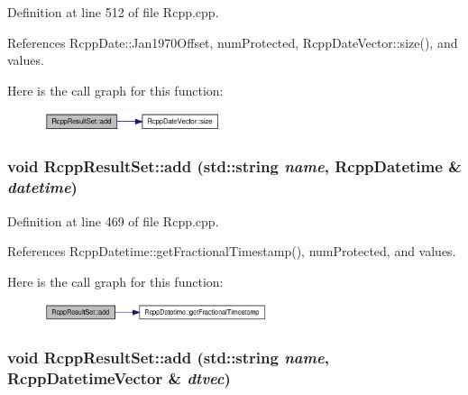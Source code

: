 Definition at line 512 of file Rcpp.cpp.

References RcppDate::Jan1970Offset, numProtected, RcppDateVector::size(), and values.

Here is the call graph for this function:\nopagebreak
\begin{figure}[H]
\begin{center}
\leavevmode
\includegraphics[width=148pt]{classRcppResultSet_d7efd746596959ce68ca98c690a2f645_cgraph}
\end{center}
\end{figure}
\hypertarget{classRcppResultSet_1d921e7a24e50369ae67a1bc63826131}{
\subsubsection[add]{\setlength{\rightskip}{0pt plus 5cm}void RcppResultSet::add (std::string {\em name}, \/  {\bf RcppDatetime} \& {\em datetime})}}
\label{classRcppResultSet_1d921e7a24e50369ae67a1bc63826131}




Definition at line 469 of file Rcpp.cpp.

References RcppDatetime::getFractionalTimestamp(), numProtected, and values.

Here is the call graph for this function:\nopagebreak
\begin{figure}[H]
\begin{center}
\leavevmode
\includegraphics[width=187pt]{classRcppResultSet_1d921e7a24e50369ae67a1bc63826131_cgraph}
\end{center}
\end{figure}
\hypertarget{classRcppResultSet_ac8cade970247a377e8dbebf1c79a86c}{
\subsubsection[add]{\setlength{\rightskip}{0pt plus 5cm}void RcppResultSet::add (std::string {\em name}, \/  {\bf RcppDatetimeVector} \& {\em dtvec})}}
\label{classRcppResultSet_ac8cade970247a377e8dbebf1c79a86c}




